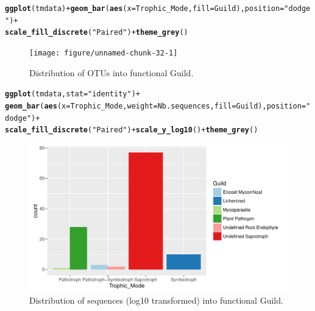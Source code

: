 \documentclass[12pt]{article}\usepackage[]{graphicx}\usepackage[]{color}
\makeatletter
\def\maxwidth{ %
  \ifdim\Gin@nat@width>\linewidth
    \linewidth
  \else
    \Gin@nat@width
  \fi
}
\newcommand{\hlstr}[1]{\textcolor[rgb]{0.192,0.494,0.8}{#1}}%
\newcommand{\hlopt}[1]{\textcolor[rgb]{0,0,0}{#1}}%
\newcommand{\hlstd}[1]{\textcolor[rgb]{0.345,0.345,0.345}{#1}}%
\newcommand{\hlkwc}[1]{\textcolor[rgb]{0.333,0.667,0.333}{#1}}%
\newcommand{\hlkwd}[1]{\textcolor[rgb]{0.737,0.353,0.396}{\textbf{#1}}}%
\newenvironment{kframe}{%
 \def\at@end@of@kframe{}%
 \ifinner\ifhmode%
  \def\at@end@of@kframe{\end{minipage}}%
  \begin{minipage}{\columnwidth}%
 \fi\fi%
 \def\FrameCommand##1{\hskip\@totalleftmargin \hskip-\fboxsep
 \colorbox{shadecolor}{##1}\hskip-\fboxsep
     \hskip-\linewidth \hskip-\@totalleftmargin \hskip\columnwidth}%
 \MakeFramed {\advance\hsize-\width
   \@totalleftmargin\z@ \linewidth\hsize
   \@setminipage}}%
 {\par\unskip\endMakeFramed%
 \at@end@of@kframe}
\newenvironment{knitrout}{}{} %
\numberwithin{figure}{section}
\makeatother
\begin{document}
\begin{knitrout}\small
{}\color{fgcolor}\begin{kframe}
\begin{alltt}
\hlkwd{ggplot}\hlstd{(tmdata)} \hlopt{+} \hlkwd{geom_bar}\hlstd{(}\hlkwd{aes}\hlstd{(}\hlkwc{x} \hlstd{= Trophic_Mode,} \hlkwc{fill}\hlstd{=Guild),} \hlkwc{position} \hlstd{=} \hlstr{"dodge"}\hlstd{)} \hlopt{+}
  \hlkwd{scale_fill_discrete}\hlstd{(}\hlstr{"Paired"}\hlstd{)} \hlopt{+} \hlkwd{theme_grey}\hlstd{()}
\end{alltt}
\end{kframe}\begin{figure}

{\centering \texttt{[image: figure/unnamed-chunk-32-1]} 

}

\caption[Distribution of OTUs into functional Guild]{Distribution of OTUs into functional Guild.}\label{fig:unnamed-chunk-32}
\end{figure}


\end{knitrout}

\begin{knitrout}\small
{}\color{fgcolor}\begin{kframe}
\begin{alltt}
\hlkwd{ggplot}\hlstd{(tmdata,} \hlkwc{stat} \hlstd{=} \hlstr{"identity"}\hlstd{)} \hlopt{+}
  \hlkwd{geom_bar}\hlstd{(}\hlkwd{aes}\hlstd{(}\hlkwc{x} \hlstd{= Trophic_Mode,} \hlkwc{weight} \hlstd{= Nb.sequences,}  \hlkwc{fill} \hlstd{= Guild),} \hlkwc{position} \hlstd{=} \hlstr{"dodge"}\hlstd{)} \hlopt{+}
  \hlkwd{scale_fill_discrete}\hlstd{(}\hlstr{"Paired"}\hlstd{)} \hlopt{+} \hlkwd{scale_y_log10}\hlstd{()} \hlopt{+} \hlkwd{theme_grey}\hlstd{()}
\end{alltt}
\end{kframe}\begin{figure}

{\centering \includegraphics[width=\maxwidth]{figure/unnamed-chunk-33-1} 

}

\caption[Distribution of sequences (log10 transformed) into functional Guild]{Distribution of sequences (log10 transformed) into functional Guild.}\label{fig:unnamed-chunk-33}
\end{figure}


\end{knitrout}
\end{document}
